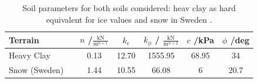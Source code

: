  
     
\begin{table}[htb]
     \centering
     \caption{Soil parameters for both soils considered: heav clay as hard equivalent for ice values and snow in Sweden \cite{Bekker}.}
     \begin{adjustbox}{max width=\textwidth}
     \begin{tabular}[l]{lcccccc}
     
     	\toprule
     		\multicolumn{1}{l}{Terrain} & \qquad \qquad	& \multicolumn{1}{c}{\(n\) /\(\frac{\text{kN}}{\text{m}^{n+1}}\)} & \multicolumn{1}{c}{\(k_\text{c}\)} & \multicolumn{1}{c}{\(k_\phi\) / \(\frac{\text{kN}}{\text{m}^{n+2}}\)} & \multicolumn{1}{c}{\(c\) /kPa} & \multicolumn{1}{c}{\(\phi\) /deg}  \\
      
       	\midrule
 
     Heavy Clay		&	&	0.13	&	12.70	&	1555.95		&	68.95	&	34			\\	
     Snow (Sweden)	&	&	1.44	&	10.55	&	66.08		&	6		&	20.7		\\	

     	\bottomrule
     
     \end{tabular}
     \end{adjustbox}
     \label{tab:SoilParam}
     \end{table}     


